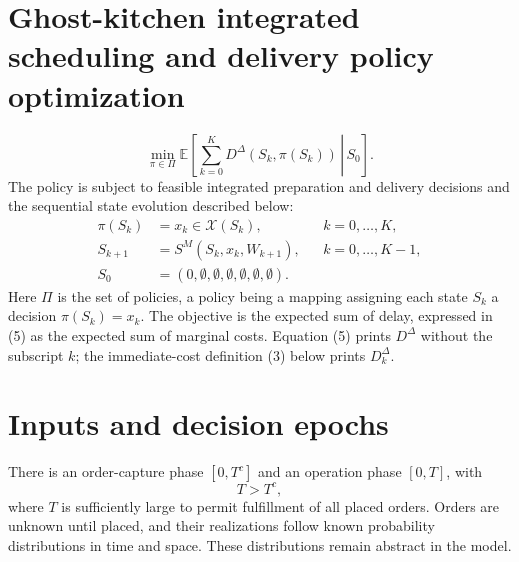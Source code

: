 \documentclass{article}
\begin{document}
\section*{Ghost-kitchen integrated scheduling and delivery policy optimization}

\begin{equation}
\min_{\pi\in\Pi}\mathbb{E}\left[\left.\sum_{k=0}^{K}D^{\Delta}(S_k,\pi(S_k))\,\right|\,S_0\right].
\tag{5}
\end{equation}
The policy is subject to feasible integrated preparation and delivery decisions and the sequential state evolution described below:
\begin{align*}
\pi(S_k)&=x_k\in\mathcal{X}(S_k), &&k=0,\ldots,K,\\
S_{k+1}&=S^M(S_k,x_k,W_{k+1}), &&k=0,\ldots,K-1,\\
S_0&=(0,\emptyset,\emptyset,\emptyset,\emptyset,\emptyset,\emptyset).
\end{align*}
Here \(\Pi\) is the set of policies, a policy being a mapping assigning each state \(S_k\) a decision \(\pi(S_k)=x_k\). The objective is the expected sum of delay, expressed in (5) as the expected sum of marginal costs. Equation (5) prints \(D^\Delta\) without the subscript \(k\); the immediate-cost definition (3) below prints \(D_k^\Delta\).

\section*{Inputs and decision epochs}

There is an order-capture phase \([0,T^c]\) and an operation phase \([0,T]\), with
\[
T>T^c,
\]
where \(T\) is sufficiently large to permit fulfillment of all placed orders. Orders are unknown until placed, and their realizations follow known probability distributions in time and space. These distributions remain abstract in the model.
\end{document}
